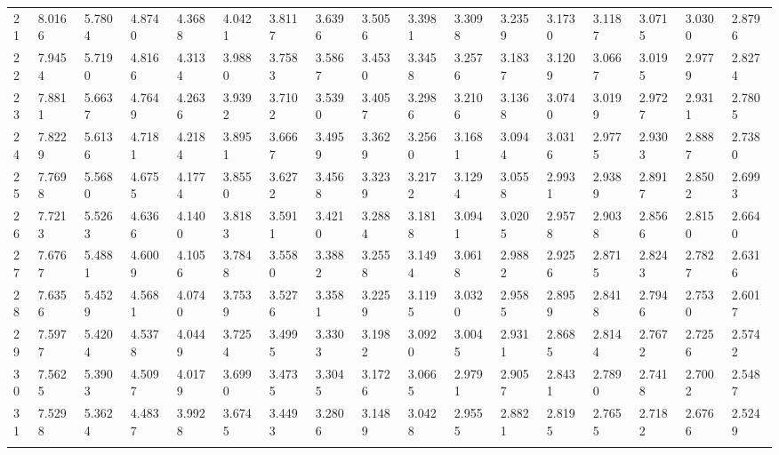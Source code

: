 {\begin{tabular}{|m{8pt}|m{18pt}*{15}{m{18pt}}}
 21 & 8.0166 & 5.7804 & 4.8740 & 4.3688 & 4.0421 & 3.8117 & 3.6396 & 3.5056 & 3.3981 & 3.3098 & 3.2359 & 3.1730 & 3.1187 & 3.0715 & 3.0300 & 2.8796 \\[2pt] \arrayrulecolor{light-gray}\hline\arrayrulecolor{black}  
 22 & 7.9454 & 5.7190 & 4.8166 & 4.3134 & 3.9880 & 3.7583 & 3.5867 & 3.4530 & 3.3458 & 3.2576 & 3.1837 & 3.1209 & 3.0667 & 3.0195 & 2.9779 & 2.8274 \\[2pt] \arrayrulecolor{light-gray}\hline\arrayrulecolor{black}  
 23 & 7.8811 & 5.6637 & 4.7649 & 4.2636 & 3.9392 & 3.7102 & 3.5390 & 3.4057 & 3.2986 & 3.2106 & 3.1368 & 3.0740 & 3.0199 & 2.9727 & 2.9311 & 2.7805 \\[2pt] \arrayrulecolor{light-gray}\hline\arrayrulecolor{black}  
 24 & 7.8229 & 5.6136 & 4.7181 & 4.2184 & 3.8951 & 3.6667 & 3.4959 & 3.3629 & 3.2560 & 3.1681 & 3.0944 & 3.0316 & 2.9775 & 2.9303 & 2.8887 & 2.7380 \\[2pt] \arrayrulecolor{light-gray}\hline\arrayrulecolor{black}  
 25 & 7.7698 & 5.5680 & 4.6755 & 4.1774 & 3.8550 & 3.6272 & 3.4568 & 3.3239 & 3.2172 & 3.1294 & 3.0558 & 2.9931 & 2.9389 & 2.8917 & 2.8502 & 2.6993 \\[2pt] \arrayrulecolor{light-gray}\hline\arrayrulecolor{black}  
 26 & 7.7213 & 5.5263 & 4.6366 & 4.1400 & 3.8183 & 3.5911 & 3.4210 & 3.2884 & 3.1818 & 3.0941 & 3.0205 & 2.9578 & 2.9038 & 2.8566 & 2.8150 & 2.6640 \\[2pt] \arrayrulecolor{light-gray}\hline\arrayrulecolor{black}  
 27 & 7.6767 & 5.4881 & 4.6009 & 4.1056 & 3.7848 & 3.5580 & 3.3882 & 3.2558 & 3.1494 & 3.0618 & 2.9882 & 2.9256 & 2.8715 & 2.8243 & 2.7827 & 2.6316 \\[2pt] \arrayrulecolor{light-gray}\hline\arrayrulecolor{black}  
 28 & 7.6356 & 5.4529 & 4.5681 & 4.0740 & 3.7539 & 3.5276 & 3.3581 & 3.2259 & 3.1195 & 3.0320 & 2.9585 & 2.8959 & 2.8418 & 2.7946 & 2.7530 & 2.6017 \\[2pt] \arrayrulecolor{light-gray}\hline\arrayrulecolor{black}  
 29 & 7.5977 & 5.4204 & 4.5378 & 4.0449 & 3.7254 & 3.4995 & 3.3303 & 3.1982 & 3.0920 & 3.0045 & 2.9311 & 2.8685 & 2.8144 & 2.7672 & 2.7256 & 2.5742 \\[2pt] \arrayrulecolor{light-gray}\hline\arrayrulecolor{black}  
 30 & 7.5625 & 5.3903 & 4.5097 & 4.0179 & 3.6990 & 3.4735 & 3.3045 & 3.1726 & 3.0665 & 2.9791 & 2.9057 & 2.8431 & 2.7890 & 2.7418 & 2.7002 & 2.5487 \\[2pt] \arrayrulecolor{light-gray}\hline\arrayrulecolor{black}  
 31 & 7.5298 & 5.3624 & 4.4837 & 3.9928 & 3.6745 & 3.4493 & 3.2806 & 3.1489 & 3.0428 & 2.9555 & 2.8821 & 2.8195 & 2.7655 & 2.7182 & 2.6766 & 2.5249 \\[2pt] \arrayrulecolor{light-gray}\hline\arrayrulecolor{black}  

\end{tabular}}
